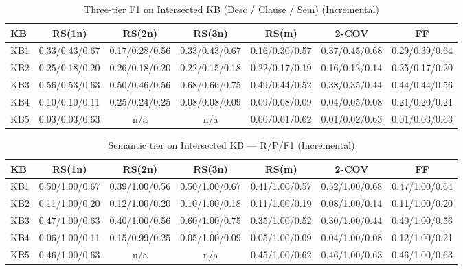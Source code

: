 \begin{table}[htbp]
\centering
\caption{Three-tier F1 on Intersected KB (Desc / Clause / Sem) (Incremental)}
\label{tab:three_tier_f1_incremental}
\begin{tabular}{lcccccc}
\toprule
KB & RS(1n) & RS(2n) & RS(3n) & RS(m) & 2-COV & FF \\
\midrule
KB1 & 0.33/0.43/0.67 & 0.17/0.28/0.56 & 0.33/0.43/0.67 & 0.16/0.30/0.57 & 0.37/0.45/0.68 & 0.29/0.39/0.64 \\
KB2 & 0.25/0.18/0.20 & 0.26/0.18/0.20 & 0.22/0.15/0.18 & 0.22/0.17/0.19 & 0.16/0.12/0.14 & 0.25/0.17/0.20 \\
KB3 & 0.56/0.53/0.63 & 0.50/0.46/0.56 & 0.68/0.66/0.75 & 0.49/0.44/0.52 & 0.38/0.35/0.44 & 0.44/0.44/0.56 \\
KB4 & 0.10/0.10/0.11 & 0.25/0.24/0.25 & 0.08/0.08/0.09 & 0.09/0.08/0.09 & 0.04/0.05/0.08 & 0.21/0.20/0.21 \\
KB5 & 0.03/0.03/0.63 & n/a & n/a & 0.00/0.01/0.62 & 0.01/0.02/0.63 & 0.01/0.03/0.63 \\
\bottomrule
\end{tabular}
\end{table}

\begin{table}[htbp]
\centering
\caption{Semantic tier on Intersected KB — R/P/F1 (Incremental)}
\label{tab:semantic_prf_incremental}
\begin{tabular}{lcccccc}
\toprule
KB & RS(1n) & RS(2n) & RS(3n) & RS(m) & 2-COV & FF \\
\midrule
KB1 & 0.50/1.00/0.67 & 0.39/1.00/0.56 & 0.50/1.00/0.67 & 0.41/1.00/0.57 & 0.52/1.00/0.68 & 0.47/1.00/0.64 \\
KB2 & 0.11/1.00/0.20 & 0.12/1.00/0.20 & 0.10/1.00/0.18 & 0.11/1.00/0.19 & 0.08/1.00/0.14 & 0.11/1.00/0.20 \\
KB3 & 0.47/1.00/0.63 & 0.40/1.00/0.56 & 0.60/1.00/0.75 & 0.35/1.00/0.52 & 0.30/1.00/0.44 & 0.40/1.00/0.56 \\
KB4 & 0.06/1.00/0.11 & 0.15/0.99/0.25 & 0.05/1.00/0.09 & 0.05/1.00/0.09 & 0.04/1.00/0.08 & 0.12/1.00/0.21 \\
KB5 & 0.46/1.00/0.63 & n/a & n/a & 0.45/1.00/0.62 & 0.46/1.00/0.63 & 0.46/1.00/0.63 \\
\bottomrule
\end{tabular}
\end{table}

